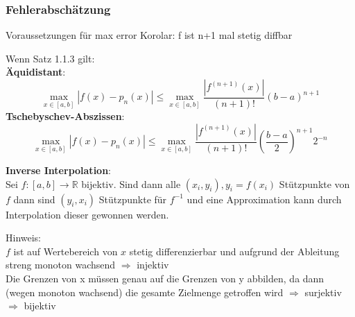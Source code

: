 \documentclass[
	ngerman,
	accentcolor=9c,%
	type=intern,
	marginpar=false
	]{tudapub}
\begin{document}
       \subsubsection{Fehlerabschätzung}
       \setcounter{satz}{2}
       \begin{satz}
            Voraussetzungen für max error Korolar: f ist n+1 mal stetig diffbar
       \end{satz}
       \begin{korolar} 
            
            Wenn Satz 1.1.3 gilt:\\
            \textbf{Äquidistant}:
            \begin{equation*}
                \max_{x \in [a,b]} |f(x) - p_n(x)| \leq \max_{x \in [a,b]} \dfrac{|f^{(n+1)}(x)|}{(n+1)!}(b-a)^{n+1}
            \end{equation*}
            \textbf{Tschebyschev-Abszissen}:
            \begin{equation*}
                \max_{x \in [a,b]} |f(x) - p_n(x)| \leq \max_{x \in [a,b]} \dfrac{|f^{(n+1)}(x)|}{(n+1)!}\left(\dfrac{b-a}{2}\right)^{n+1}2^{-n}
            \end{equation*}
       \end{korolar}
       \textbf{Inverse Interpolation}:\\
       Sei $f:[a,b] \rightarrow \mathbb{R}$ bijektiv.
       Sind dann alle $(x_i,y_i), y_i = f(x_i)$ Stützpunkte von $f$
       dann sind $(y_i, x_i)$ Stützpunkte für $f^{-1}$ und eine Approximation kann durch Interpolation dieser
       gewonnen werden.


       Hinweis:\\
       $f$ ist auf Wertebereich von $x$ stetig differenzierbar und aufgrund der Ableitung streng monoton wachsend $\Rightarrow$ injektiv\\
       Die Grenzen von x müssen genau  auf die Grenzen von y abbilden, da dann (wegen monoton wachsend) die gesamte Zielmenge getroffen wird $\Rightarrow$ surjektiv\\
       $\Rightarrow$ bijektiv
\end{document}
